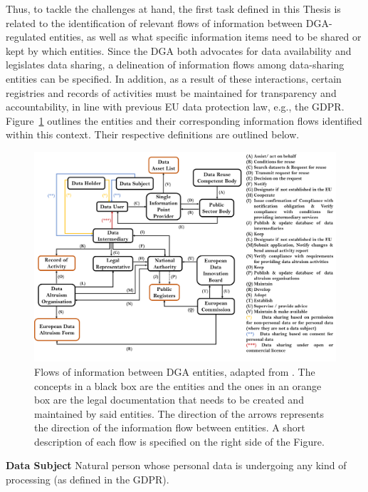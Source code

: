 Thus, to tackle the challenges at hand, the first task defined in this Thesis is related to the identification of relevant flows of information between DGA-regulated entities, as well as what specific information items need to be shared or kept by which entities.
Since the DGA both advocates for data availability and legislates data sharing, a delineation of information flows among data-sharing entities can be specified.
In addition, as a result of these interactions, certain registries and records of activities must be maintained for transparency and accountability, in line with previous EU data protection law, e.g., the GDPR.
Figure~\ref{fig:dga_flow} outlines the entities and their corresponding information flows identified within this context.
Their respective definitions are outlined below.

\begin{figure}[ht]
\centering
\includegraphics[width=\textwidth]{figures/chapter-7/information-flows.png}
\caption[Flows of information between DGA entities.]{Flows of information between DGA entities, adapted from \cite{esteves_semantics_2023}. The concepts in a black box are the entities and the ones in an orange box are the legal documentation that needs to be created and maintained by said entities. The direction of the arrows represents the direction of the information flow between entities. A short description of each flow is specified on the right side of the Figure.}
\label{fig:dga_flow}
\end{figure}

\textbf{Data Subject} Natural person whose personal data is undergoing any kind of processing (as defined in the GDPR).

